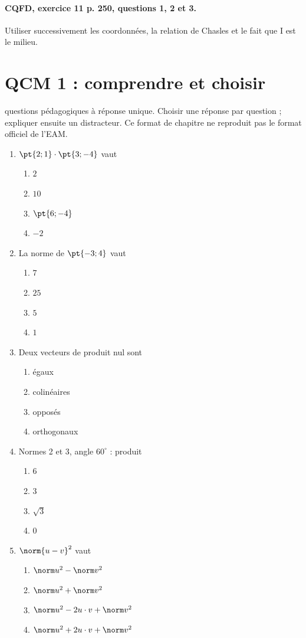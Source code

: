 \paragraph{CQFD, exercice 11 p. 250, questions 1, 2 et 3.}\label{C03-M2} Utiliser successivement les coordonnées, la relation de Chasles et le fait que I est le milieu.
\begingroup\small
\mxnewpage\section*{QCM 1 : comprendre et choisir}\label{C03-Q1}
 questions pédagogiques à réponse unique. Choisir une réponse par question ; expliquer ensuite un distracteur. Ce format de chapitre ne reproduit pas le format officiel de l’EAM.
\begin{enumerate}
\item $\pt{2;1}\cdot\pt{3;-4}$ vaut
\begin{enumerate}[label=\Alph*.,itemsep=2pt]
\item $2$
\item $10$
\item $\pt{6;-4}$
\item $-2$
\end{enumerate}
\item La norme de $\pt{-3;4}$ vaut
\begin{enumerate}[label=\Alph*.,itemsep=2pt]
\item $7$
\item $25$
\item $5$
\item $1$
\end{enumerate}
\item Deux vecteurs de produit nul sont
\begin{enumerate}[label=\Alph*.,itemsep=2pt]
\item égaux
\item colinéaires
\item opposés
\item orthogonaux
\end{enumerate}
\item Normes 2 et 3, angle $60^\circ$ : produit
\begin{enumerate}[label=\Alph*.,itemsep=2pt]
\item $6$
\item $3$
\item $\sqrt3$
\item $0$
\end{enumerate}
\item $\norm{u-v}^2$ vaut
\begin{enumerate}[label=\Alph*.,itemsep=2pt]
\item $\norm u^2-\norm v^2$
\item $\norm u^2+\norm v^2$
\item $\norm u^2-2u\cdot v+\norm v^2$
\item $\norm u^2+2u\cdot v+\norm v^2$
\end{enumerate}
\end{enumerate}
